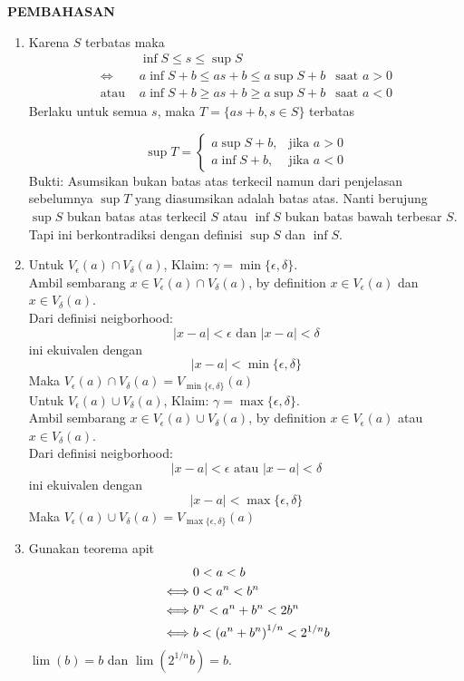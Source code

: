 \documentclass{article}
\begin{document}
\newpage
\begin{center}
\textbf{\large{PEMBAHASAN}}
\end{center}
\begin{enumerate}[leftmargin=*, label={\arabic*}.]
\item Karena $S$ terbatas maka
\begin{align*}
    &\inf S \leq s \leq \sup S\\
    \iff &a \inf S + b \leq as+b \leq a \sup S + b &\text{saat $a>0$}\\
    \text{atau } &a \inf S + b \geq as+b \geq a \sup S + b &\text{saat $a<0$}
\end{align*}
Berlaku untuk semua $s$, maka $T=\{as+b, s\in S\}$ terbatas


\[\sup T=
\begin{cases}
    a \sup S + b, &\text{jika $a > 0$}\\
    a \inf S + b, &\text{jika $a < 0$}    
\end{cases}\]
Bukti: Asumsikan bukan batas atas terkecil namun dari penjelasan sebelumnya 
$\sup T$ yang diasumsikan adalah batas atas. Nanti berujung $\sup S$ 
bukan batas atas terkecil $S$ atau $\inf S$ bukan batas bawah terbesar $S$. 
Tapi ini berkontradiksi dengan definisi $\sup S$ dan $\inf S$.

\item Untuk $V_\epsilon (a)\cap V_\delta(a)$, Klaim: $\gamma = \min\{\epsilon, \delta\}$.\\
Ambil sembarang $x \in V_\epsilon (a)\cap V_\delta(a)$, by definition $x \in V_\epsilon (a)$ dan $x \in V_\delta(a)$.\\
Dari definisi neigborhood:
\[
    |x-a| < \epsilon \text{ dan } |x-a| < \delta
\]
ini ekuivalen dengan 
\[
    |x-a| < \min\{\epsilon, \delta\}
\]
Maka $V_\epsilon (a)\cap V_\delta(a) = V_{\min\{\epsilon, \delta\}}(a)$\\

Untuk $V_\epsilon (a)\cup V_\delta(a)$, Klaim: $\gamma = \max\{\epsilon, \delta\}$.\\
Ambil sembarang $x \in V_\epsilon (a)\cup V_\delta(a)$, by definition $x \in V_\epsilon (a)$ atau $x \in V_\delta(a)$.\\
Dari definisi neigborhood:
\[
    |x-a| < \epsilon \text{ atau } |x-a| < \delta
\]
ini ekuivalen dengan 
\[
    |x-a| < \max\{\epsilon, \delta\}
\]
Maka $V_\epsilon (a)\cup V_\delta(a) = V_{\max\{\epsilon, \delta\}}(a)$

\item Gunakan teorema apit
\begin{align*}
    &0 < a < b\\
    \iff& 0 < a^n < b^n\\
    \iff& b^n < a^n+b^n < 2b^n\\
    \iff& b < \oio*{a^n+b^n}^{1/n} < 2^{1/n}b
\end{align*}
$\lim (b) = b$ dan $\lim (2^{1/n}b) = b$.


\end{enumerate}
\end{document}
